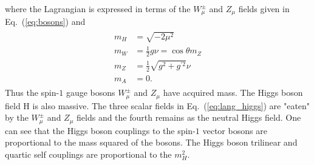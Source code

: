 where the Lagrangian is expressed in terms of the $W_{\mu}^{\pm}$ and $Z_\mu$ fields given in Eq.~(\ref{eq:bosons}) and
 \begin{eqnarray} \label{eq:masses}
 \begin{aligned}
m_{H}  &= \sqrt{-2\mu^2} \\
m_{W} &= \frac{1}{2}g\nu = \cos\theta m_{Z} \\
m_{Z} &= \frac{1}{2} \sqrt{g^2+g^{'2}}\nu \\
m_{A} &= 0.
\end{aligned}
\end{eqnarray}
Thus the spin-$1$ gauge bosons $W_{\mu}^{\pm}$ and $Z_\mu$ have acquired mass. The Higgs boson field H is also massive. The three scalar fields in Eq.~(\ref{eq:lang_higgs}) are "eaten" by the $W_{\mu}^{\pm}$ and $Z_\mu$ fields and the fourth remains as the neutral Higgs field. One can see that the Higgs boson couplings to the spin-$1$ vector bosons are proportional to the mass squared of the bosons. The Higgs boson trilinear and quartic self couplings are proportional to the $m_{H}^2$.

